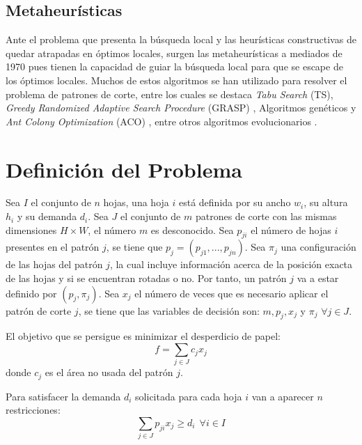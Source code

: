 \documentclass[a4paper,10pt,twocolumn]{article}
\begin{document}
\subsection{ Metaheurísticas }
Ante el problema que presenta la búsqueda local y
las heurísticas constructivas de quedar atrapadas en
óptimos locales, surgen las metaheurísticas a mediados
de 1970 pues tienen la capacidad de guiar la búsqueda
local para que se escape de los óptimos locales. Muchos
de estos algoritmos se han utilizado para resolver
el problema de patrones de corte, entre los cuales
se destaca \textit{Tabu Search} (TS), \textit{Greedy Randomized
Adaptive Search Procedure} (GRASP) \cite{42}, Algoritmos
genéticos \cite{43,46} y \textit{Ant Colony Optimization} (ACO) \cite{47,48}, entre otros algoritmos evolucionarios \cite{51}.

\section{Definición del Problema}
Sea $I$ el conjunto de $n$ hojas, una hoja $i$ está definida por su ancho $w_i$, su altura $h_i$ y su demanda $d_i$. Sea $J$ el conjunto de $m$ patrones de corte con las mismas dimensiones $H \times W$, el número $m$ es desconocido. Sea $p_{ji}$ el número de hojas $i$ presentes en el patrón $j$, se tiene que $p_j = (p_{j1},...,p_{jn})$. Sea $\pi_j$ una configuración de las hojas del patrón $j$, la cual incluye información acerca de la posición exacta de las hojas y si se encuentran rotadas o no. Por tanto, un patrón $j$ va a estar definido por $(p_j,\pi_j)$. Sea $x_j$ el número de veces que es necesario aplicar el patrón de corte $j$, se tiene que las variables de decisión son: $m, p_j, x_j$ y $\pi_j$ $\forall j \in J$.  

El objetivo que se persigue es minimizar el desperdicio de papel:
\begin{equation}
f = \sum_{j \in J}c_j x_j
\label{eq1}
\end{equation}
donde $c_j$ es el área no usada del patrón $j$.

Para satisfacer la demanda $d_i$ solicitada para cada hoja $i$ van a aparecer $n$ restricciones:
\begin{equation}
\sum_{j \in J}p_{ji}x_j \geq  d_i \ \  \forall i \in I
\label{eq2}
\end{equation}
\end{document}
